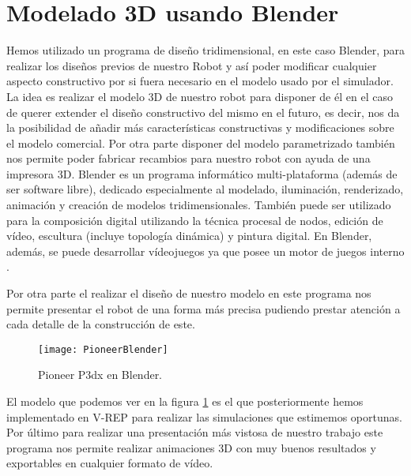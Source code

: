 \section{Modelado 3D usando Blender}
%
%
%
Hemos utilizado un programa de diseño tridimensional, en este caso Blender, para realizar los diseños previos de nuestro Robot y así poder modificar cualquier aspecto constructivo por si fuera necesario en el modelo usado por el simulador. 
La idea es realizar el modelo 3D de nuestro robot para disponer de él en el caso de querer extender el diseño constructivo del mismo en el futuro, es decir, nos da la posibilidad de añadir más características constructivas y modificaciones sobre el modelo comercial.
Por otra parte disponer del modelo parametrizado también nos permite poder fabricar recambios para nuestro robot con ayuda de una impresora 3D.%
%
%
%
Blender es un programa informático multi-plataforma (además de ser software libre), dedicado especialmente al modelado, iluminación, renderizado, animación y creación de modelos tridimensionales. También puede ser utilizado para la composición digital utilizando la técnica procesal de nodos, edición de vídeo, escultura (incluye topología dinámica) y pintura digital. En Blender, además, se puede desarrollar vídeojuegos ya que posee un motor de juegos interno \cite{_blender_2016}.

Por otra parte el realizar el diseño de nuestro modelo en este programa nos permite presentar el robot de una forma más precisa pudiendo prestar atención a cada detalle de la construcción de este.
\begin{figure}[ht!]
\centering
\texttt{[image: PioneerBlender]}
\caption{Pioneer P3dx en Blender.} \label{Pioneer_3dx_Blender}
\end{figure}
El modelo que podemos ver en la figura \ref{Pioneer_3dx_Blender} es el que posteriormente hemos implementado en V-REP para realizar las simulaciones que estimemos oportunas.
Por último para realizar una presentación más vistosa de nuestro trabajo este programa nos permite realizar animaciones 3D con muy buenos resultados y  exportables en cualquier formato de vídeo.

